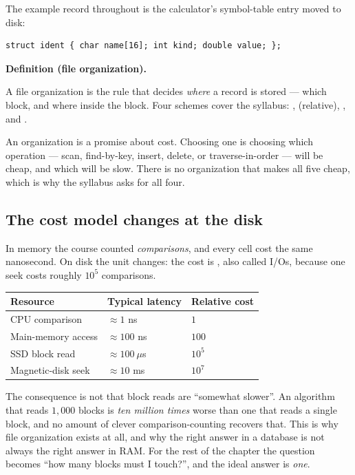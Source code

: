 \documentclass[11pt]{article}
\newenvironment{definitionbox}[1]{%
  \par\noindent\textbf{Definition (#1).}\ \itshape
}{\par\vspace{0.3em}}
\begin{document}
The example record throughout is the calculator's symbol-table entry moved to disk:
\begin{verbatim}
struct ident { char name[16]; int kind; double value; };
\end{verbatim}

\begin{definitionbox}{file organization}
A file organization is the rule that decides \emph{where} a record is stored --- which block, and where inside the block. Four schemes cover the syllabus: ,  (relative), , and .
\end{definitionbox}

An organization is a promise about cost. Choosing one is choosing which operation --- scan, find-by-key, insert, delete, or traverse-in-order --- will be cheap, and which will be slow. There is no organization that makes all five cheap, which is why the syllabus asks for all four.

\subsection{The cost model changes at the disk}

In memory the course counted \emph{comparisons}, and every cell cost the same nanosecond. On disk the unit changes: the cost is , also called I/Os, because one seek costs roughly $10^5$ comparisons.

\begin{center}
{\footnotesize
\begin{tabular}{lll}
  \toprule
  Resource & Typical latency & Relative cost \\
  \midrule
  CPU comparison & $\approx 1$ ns & $1$ \\
  Main-memory access & $\approx 100$ ns & $100$ \\
  SSD block read & $\approx 100\ \mu$s & $10^5$ \\
  Magnetic-disk seek & $\approx 10$ ms & $10^7$ \\
  \bottomrule
\end{tabular}}
\end{center}

The consequence is not that block reads are ``somewhat slower''. An algorithm that reads $1{,}000$ blocks is \emph{ten million times} worse than one that reads a single block, and no amount of clever comparison-counting recovers that. This is why file organization exists at all, and why the right answer in a database is not always the right answer in RAM. For the rest of the chapter the question becomes ``how many blocks must I touch?'', and the ideal answer is \emph{one}.
\end{document}
